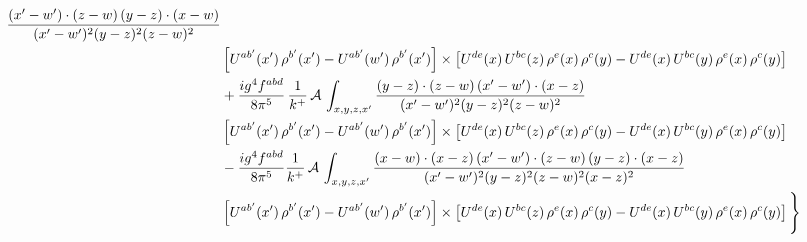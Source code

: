 \documentclass[9pt]{article}
\numberwithin{equation}{section}
\begin{document}
\begin{align}
\frac{(x'-w')\cdot(z-w)\,(y-z)\cdot(x-w)}{(x'-w')^{2}(y-z)^{2}(z-w)^{2}}\notag \\
& \left[U^{ab'}(x')\,\rho^{b'}(x')-U^{ab'}(w')\, \rho^{b'}(x')\right]\times \left[U^{de}(x)\,U^{bc}(z)\, \rho^{e}(x)\,\rho^{c}(y)-U^{de}(x)\,U^{bc}(y)\,\rho^{e}(x)\,\rho^{c}(y)\right]\notag \\ & +\frac{ig^{4}f^{abd}}{8\pi^{5}}\,\frac{1}{k^{+}}\,\mathcal{A}\,\int_{x,y,z,x'}
\frac{(y-z)\cdot(z-w)\,(x'-w')\cdot(x-z)}{(x'-w')^{2}(y-z)^{2}(z-w)^{2}}\notag \\ & \left[U^{ab'}(x')\,\rho^{b'}(x')-U^{ab'}(w')\, \rho^{b'}(x')\right]\times \left[U^{de}(x)\,U^{bc}(z)\, \rho^{e}(x)\,\rho^{c}(y)-U^{de}(x)\,U^{bc}(y)\,\rho^{e}(x)\,\rho^{c}(y)\right]\notag \\ & -\frac{ig^{4}f^{abd}}{8\pi^{5}}\frac{1}{k^{+}}\,\mathcal{A}\,\int_{x,y,z,x'}
\frac{(x-w)\cdot(x-z)\,(x'-w')\cdot(z-w)\,(y-z)\cdot(x-z)}{(x'-w')^{2}(y-z)^{2}(z-w)^{2}(x-z)^{2}}\notag \\ & \left[U^{ab'}(x')\,\rho^{b'}(x')-U^{ab'}(w')\, \rho^{b'}(x')\right]\times \left[U^{de}(x)\,U^{bc}(z)\, \rho^{e}(x)\,\rho^{c}(y)-U^{de}(x)\,U^{bc}(y)\,\rho^{e}(x)\,\rho^{c}(y)\right]\Bigg\}
\end{align}
\end{document}

